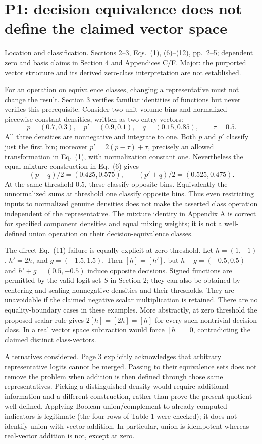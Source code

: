 \documentclass[10pt]{article}
\begin{document}
\section*{P1: decision equivalence does not define the claimed vector space}
Location and classification. Sections 2–3, Eqs. (1), (6)–(12), pp. 2–5; dependent zero and basis claims in Section 4 and Appendices C/F. Major: the purported vector structure and its derived zero-class interpretation are not established.\par
For an operation on equivalence classes, changing a representative must not change the result. Section 3 verifies familiar identities of functions but never verifies this prerequisite. Consider two unit-volume bins and normalized piecewise-constant densities, written as two-entry vectors: \[p=(0.7,0.3),\quad p'=(0.9,0.1),\quad q=(0.15,0.85),
 \qquad \tau=0.5.\] All three densities are nonnegative and integrate to one. Both \(p\) and \(p'\) classify just the first bin; moreover \(p'=2(p-\tau)+\tau\), precisely an allowed transformation in Eq. (1), with normalization constant one. Nevertheless the equal-mixture construction in Eq. (6) gives \[(p+q)/2=(0.425,0.575),\qquad (p'+q)/2=(0.525,0.475).\] At the same threshold \(0.5\), these classify opposite bins. Equivalently the unnormalized sums at threshold one classify opposite bins. Thus even restricting inputs to normalized genuine densities does not make the asserted class operation independent of the representative. The mixture identity in Appendix A is correct for specified component densities and equal mixing weights; it is not a well-defined union operation on their decision-equivalence classes.\par
The direct Eq. (11) failure is equally explicit at zero threshold. Let \(h=(1,-1)\), \(h'=2h\), and \(g=(-1.5,1.5)\). Then \([h]=[h']\), but \(h+g=(-0.5,0.5)\) and \(h'+g=(0.5,-0.5)\) induce opposite decisions. Signed functions are permitted by the valid-logit set \(S\) in Section 2; they can also be obtained by centering and scaling nonnegative densities and their thresholds. They are unavoidable if the claimed negative scalar multiplication is retained. There are no equality-boundary cases in these examples. More abstractly, at zero threshold the proposed scalar rule gives \(2[h]=[2h]=[h]\) for every such nontrivial decision class. In a real vector space subtraction would force \([h]=0\), contradicting the claimed distinct class-vectors.\par
Alternatives considered. Page 3 explicitly acknowledges that arbitrary representative logits cannot be merged. Passing to their equivalence sets does not remove the problem when addition is then defined through those same representatives. Picking a distinguished density would require additional information and a different construction, rather than prove the present quotient well-defined. Applying Boolean union/complement to already computed indicators is legitimate (the four rows of Table 1 were checked); it does not identify union with vector addition. In particular, union is idempotent whereas real-vector addition is not, except at zero.\par
\end{document}
